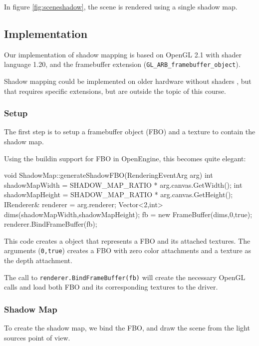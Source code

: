 In figure \ref{fig:sceneshadow}, the scene is rendered using a single
shadow map.

\newpage


\subsection{Implementation}

Our implementation of shadow mapping is based on OpenGL 2.1 with
shader language 1.20, and the framebuffer extension
(\texttt{GL\_ARB\_framebuffer\_object}).

Shadow mapping could be implemented on older hardware without
shaders \citep{nv01}, but that requires specific extensions, but are
outside the topic of this course.


\subsubsection*{Setup}

The first step is to setup a framebuffer object (FBO) and a texture to
contain the shadow map.

Using the buildin support for FBO in OpenEngine, this becomes quite elegant:

\begin{cppcode}
void ShadowMap::generateShadowFBO(RenderingEventArg arg) {
	int shadowMapWidth = SHADOW_MAP_RATIO * arg.canvas.GetWidth();
	int shadowMapHeight = SHADOW_MAP_RATIO * arg.canvas.GetHeight();
    IRenderer& renderer = arg.renderer;
    Vector<2,int> dims(shadowMapWidth,shadowMapHeight);
    fb = new FrameBuffer(dims,0,true);
    renderer.BindFrameBuffer(fb);
}
\end{cppcode}

This code creates a object that represents a FBO and its attached
textures. The arguments (\texttt{0,true}) creates a FBO with zero color
attachments and a texture as the depth attachment.

The call to \texttt{renderer.BindFrameBuffer(fb)} will create the
necessary OpenGL calls and load both FBO and its corresponding
textures to the driver.

\subsubsection*{Shadow Map}

To create the shadow map, we bind the FBO, and draw the scene from the
light sources point of view. 

